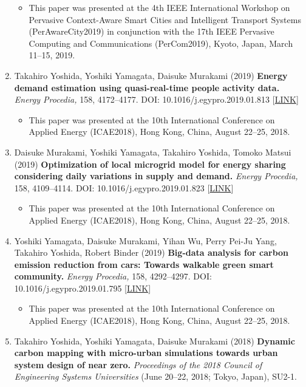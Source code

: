 \documentclass[]{book}
\providecommand{\tightlist}{%
  \setlength{\itemsep}{0pt}\setlength{\parskip}{0pt}}
\begin{document}
\begin{enumerate}
  \begin{itemize}
  \tightlist
  \item
    This paper was presented at the 4th IEEE International Workshop on Pervasive Context-Aware Smart Cities and Intelligent Transport Systems (PerAwareCity2019) in conjunction with the 17th IEEE Pervasive Computing and Communications (PerCom2019), Kyoto, Japan, March 11--15, 2019.
  \end{itemize}
\item
  Takahiro Yoshida, Yoshiki Yamagata, Daisuke Murakami (2019)
  \textbf{Energy demand estimation using quasi-real-time people activity data.}
  \emph{Energy Procedia,} 158, 4172--4177.
  DOI: 10.1016/j.egypro.2019.01.813 {[}\href{https://www.sciencedirect.com/science/article/pii/S1876610219308537}{LINK}{]}

  \begin{itemize}
  \tightlist
  \item
    This paper was presented at the 10th International Conference on Applied Energy (ICAE2018), Hong Kong, China, August 22--25, 2018.
  \end{itemize}
\item
  Daisuke Murakami, Yoshiki Yamagata, Takahiro Yoshida, Tomoko Matsui (2019)
  \textbf{Optimization of local microgrid model for energy sharing considering daily variations in supply and demand.}
  \emph{Energy Procedia,} 158, 4109--4114.
  DOI: 10.1016/j.egypro.2019.01.823 {[}\href{https://www.sciencedirect.com/science/article/pii/S187661021930863X}{LINK}{]}

  \begin{itemize}
  \tightlist
  \item
    This paper was presented at the 10th International Conference on Applied Energy (ICAE2018), Hong Kong, China, August 22--25, 2018.
  \end{itemize}
\item
  Yoshiki Yamagata, Daisuke Murakami, Yihan Wu, Perry Pei-Ju Yang, Takahiro Yoshida, Robert Binder (2019)
  \textbf{Big-data analysis for carbon emission reduction from cars: Towards walkable green smart community.}
  \emph{Energy Procedia,} 158, 4292--4297.
  DOI: 10.1016/j.egypro.2019.01.795 {[}\href{https://www.sciencedirect.com/science/article/pii/S1876610219308331}{LINK}{]}

  \begin{itemize}
  \tightlist
  \item
    This paper was presented at the 10th International Conference on Applied Energy (ICAE2018), Hong Kong, China, August 22--25, 2018.
  \end{itemize}
\item
  Takahiro Yoshida, Yoshiki Yamagata, Daisuke Murakami (2018)
  \textbf{Dynamic carbon mapping with micro-urban simulations towards urban system design of near zero.}
  \emph{Proceedings of the 2018 Council of Engineering Systems Universities} (June 20--22, 2018; Tokyo, Japan), SU2-1.


\end{enumerate}
\end{document}
